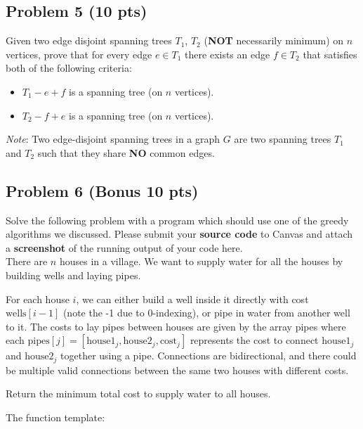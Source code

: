 \documentclass[12pt]{article}
\begin{document}
\subsection*{Problem 5 (10 pts)}
Given two edge disjoint spanning trees $T_1$, $T_2$ (\textbf{NOT} necessarily minimum) on $n$ vertices, prove that for every 
edge $e \in T_1$ there exists an edge $f \in T_2$ that satisfies both of the following criteria:
\begin{itemize}
    \item $T_1 - e + f$ is a spanning tree (on $n$ vertices).
    \item $T_2 - f + e$ is a spanning tree (on $n$ vertices).
\end{itemize}
\textit{Note}: Two edge-disjoint spanning trees in a graph $G$ are two spanning trees $T_1$ and $T_2$ such that they share \textbf{NO} common edges. 

\subsection*{Problem 6 (Bonus 10 pts)}
Solve the following problem with a program which should use one of the greedy algorithms we discussed. Please submit your \textbf{source code} to Canvas and attach a \textbf{screenshot} of the running output of your code here.\\

There are $n$ houses in a village. We want to supply water for all the houses by building wells and laying pipes. 

For each house $i$, we can either build a well inside it directly with cost $\text{wells}[i - 1]$ (note the -1 due to 0-indexing), or pipe in water from another well to it. The costs to lay pipes between houses are given by the array pipes where each $\text{pipes}[j] = [\text{house}1_j, \text{house}2_j, \text{cost}_j]$ represents the cost to connect $\text{house}1_j$ and $\text{house}2_j$ together using a pipe. Connections are bidirectional, and there could be multiple valid connections between the same two houses with different costs. 

Return the minimum total cost to supply water to all houses.

\vspace{10pt}

The function template: \\

\end{document}
